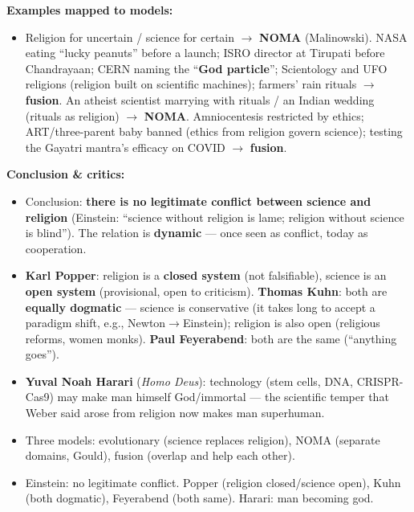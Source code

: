 \begin{ExampleBox}
\textbf{Examples mapped to models:}
\begin{itemize}
\item Religion for uncertain / science for certain $\rightarrow$ \textbf{NOMA} (Malinowski). NASA eating ``lucky peanuts'' before a launch; ISRO director at Tirupati before Chandrayaan; CERN naming the ``\textbf{God particle}''; Scientology and UFO religions (religion built on scientific machines); farmers' rain rituals $\rightarrow$ \textbf{fusion}. An atheist scientist marrying with rituals / an Indian wedding (rituals as religion) $\rightarrow$ \textbf{NOMA}. Amniocentesis restricted by ethics; ART/three-parent baby banned (ethics from religion govern science); testing the Gayatri mantra's efficacy on COVID $\rightarrow$ \textbf{fusion}.
\end{itemize}
\end{ExampleBox}

\begin{CriticalPoint}
\textbf{Conclusion \& critics:}
\begin{itemize}
\item Conclusion: \textbf{there is no legitimate conflict between science and religion} (Einstein: ``science without religion is lame; religion without science is blind''). The relation is \textbf{dynamic} --- once seen as conflict, today as cooperation.
\item \textbf{Karl Popper}: religion is a \textbf{closed system} (not falsifiable), science is an \textbf{open system} (provisional, open to criticism). \textbf{Thomas Kuhn}: both are \textbf{equally dogmatic} --- science is conservative (it takes long to accept a paradigm shift, e.g., Newton$\rightarrow$Einstein); religion is also open (religious reforms, women monks). \textbf{Paul Feyerabend}: both are the same (``anything goes'').
\item \textbf{Yuval Noah Harari} (\textit{Homo Deus}): technology (stem cells, DNA, CRISPR-Cas9) may make man himself God/immortal --- the scientific temper that Weber said arose from religion now makes man superhuman.
\end{itemize}
\end{CriticalPoint}

\begin{QuickRevision}
\begin{itemize}
\item Three models: evolutionary (science replaces religion), NOMA (separate domains, Gould), fusion (overlap and help each other).
\item Einstein: no legitimate conflict. Popper (religion closed/science open), Kuhn (both dogmatic), Feyerabend (both same). Harari: man becoming god.
\end{itemize}
\end{QuickRevision}

